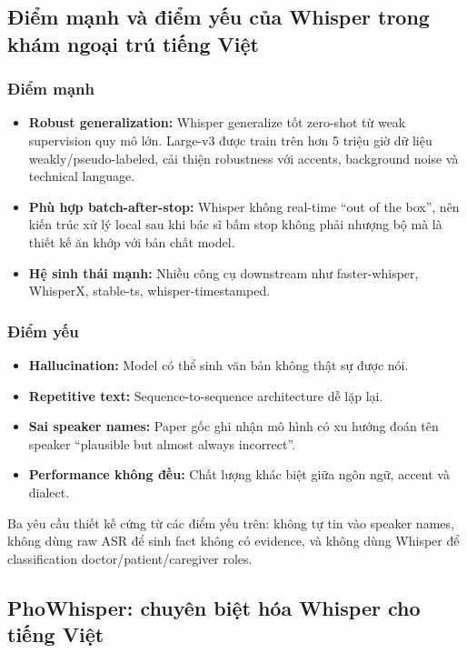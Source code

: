 \subsection{Điểm mạnh và điểm yếu của Whisper trong khám ngoại trú tiếng Việt}

\subsubsection{Điểm mạnh}

\begin{itemize}
    \item \textbf{Robust generalization:} Whisper generalize tốt zero-shot từ weak supervision quy mô lớn. Large-v3 được train trên hơn 5 triệu giờ dữ liệu weakly/pseudo-labeled, cải thiện robustness với accents, background noise và technical language.
    \item \textbf{Phù hợp batch-after-stop:} Whisper không real-time ``out of the box'', nên kiến trúc xử lý local sau khi bác sĩ bấm stop không phải nhượng bộ mà là thiết kế ăn khớp với bản chất model.
    \item \textbf{Hệ sinh thái mạnh:} Nhiều công cụ downstream như faster-whisper, WhisperX, stable-ts, whisper-timestamped.
\end{itemize}

\subsubsection{Điểm yếu}

\begin{itemize}
    \item \textbf{Hallucination:} Model có thể sinh văn bản không thật sự được nói.
    \item \textbf{Repetitive text:} Sequence-to-sequence architecture dễ lặp lại.
    \item \textbf{Sai speaker names:} Paper gốc ghi nhận mô hình có xu hướng đoán tên speaker ``plausible but almost always incorrect''.
    \item \textbf{Performance không đều:} Chất lượng khác biệt giữa ngôn ngữ, accent và dialect.
\end{itemize}

Ba yêu cầu thiết kế cứng từ các điểm yếu trên: không tự tin vào speaker names, không dùng raw ASR để sinh fact không có evidence, và không dùng Whisper để classification doctor/patient/caregiver roles.

\subsection{PhoWhisper: chuyên biệt hóa Whisper cho tiếng Việt}

